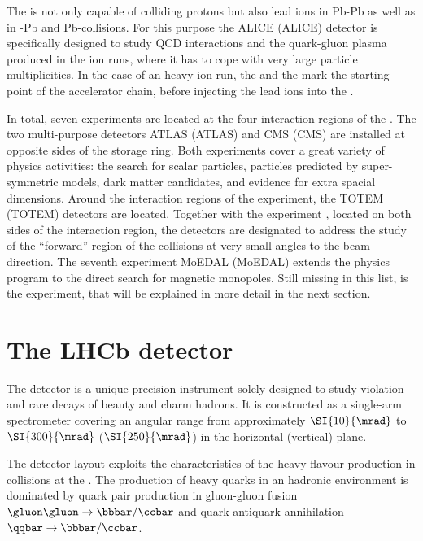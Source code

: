The \LHC is not only capable of colliding protons but also lead ions in Pb-Pb as
well as in \proton-Pb and Pb-\proton collisions. For this purpose the
\acs{ALICE} (\acl{ALICE}) detector \cite{Aamodt:2008zz} is specifically designed
to study QCD interactions and the quark-gluon plasma produced in the \LHC ion
runs, where it has to cope with very large particle multiplicities. In the case
of an heavy ion run, the
\LINACThree and the \LEIR mark the starting point of the accelerator chain,
before injecting the lead ions into the \PSyn.

In total, seven experiments are located at the four interaction regions of the
\LHC. The two multi-purpose detectors \acs{ATLAS} (\acl{ATLAS})
\cite{Aad:2008zzm} and \acs{CMS} (\acl{CMS}) \cite{Chatrchyan:2008aa} are
installed at opposite sides of the storage ring. Both experiments cover a great
variety of physics activities: the search for scalar particles, particles
predicted by super-symmetric models, dark matter candidates, and evidence for
extra spacial dimensions. Around the interaction regions of the \CMS experiment,
the \acs{TOTEM} (\acl{TOTEM}) detectors \cite{Anelli:2008zza} are located.
Together with the \LHCf experiment \cite{Adriani:2008zz}, located on both sides
of the \ATLAS interaction region, the detectors are designated to address the
study of the \enquote{forward} region of the collisions at very small angles to
the beam direction. The seventh experiment \acs{MoEDAL} (\acl{MoEDAL}) extends
the \LHC physics program to the direct search for magnetic monopoles. Still
missing in this list, is the \LHCb experiment, that will be explained in more
detail in the next section.


\section{The LHCb detector}
\label{sec:lhcb_experiment:detector}

The \LHCb detector is a unique precision instrument solely designed to study \CP
violation and rare decays of beauty and charm hadrons. It is constructed as a
single-arm spectrometer covering an angular range from approximately
$\SI{10}{\mrad}$ to $\SI{300}{\mrad}$ ($\SI{250}{\mrad}$) in the
horizontal (vertical) plane.

The detector layout exploits the characteristics of the heavy flavour production
in \protonproton collisions at the \LHC. The production of heavy quarks in an
hadronic environment is dominated by quark pair production in gluon-gluon fusion
$\gluon\gluon\to\bbbar/\ccbar$ and quark-antiquark annihilation
$\qqbar\to\bbbar/\ccbar$.

